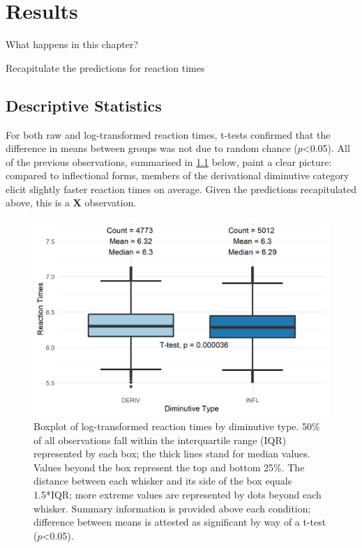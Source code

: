 \chapter{Results}\label{chp:results}

What happens in this chapter?

Recapitulate the predictions for reaction times
\section{Descriptive Statistics} \label{sec:desc_stats}

For both raw and log-transformed reaction times, t-tests confirmed that the difference in means between groups was not due to random chance ($p$<0.05). All of the previous observations, summarised in \ref{fig:boxplot} below, paint a clear picture: compared to inflectional forms, members of the derivational diminutive category elicit slightly faster reaction times on average. Given the predictions recapitulated above, this is a \textbf{X} observation.
\begin{figure}[h]
    \centering
    \includegraphics[width=\textwidth]{images/dim_box.png}
    \caption[Boxplot of log-transformed reaction times by diminutive type]{Boxplot of log-transformed reaction times by diminutive type. 50\% of all observations fall within the interquartile range (IQR) represented by each box; the thick lines stand for median values. Values beyond the box represent the top and bottom 25\%. The distance between each whisker and its side of the box equals 1.5*IQR; more extreme values are represented by dots beyond each whisker. Summary information is provided above each condition; difference between means is attested as significant by way of a t-test ($p$<0.05).}
    \label{fig:boxplot}
\end{figure}

